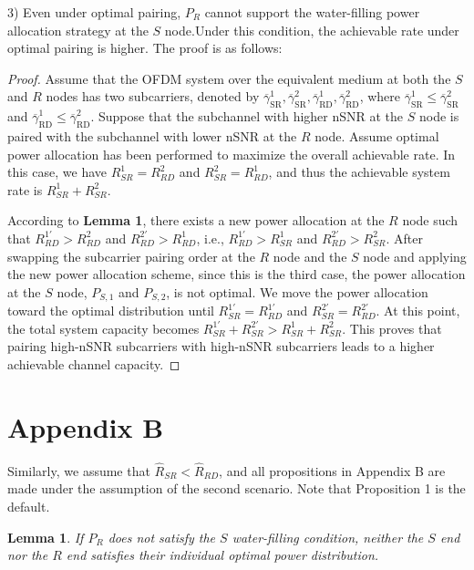 \documentclass[lettersize,journal]{IEEEtran}
\newtheorem{lemma}{Lemma}  %
\begin{document}
	3) Even under optimal pairing, \( P_R \) cannot support the water-filling power allocation strategy at the \( S \) node.Under this condition, the achievable rate under optimal pairing is higher. The proof is as follows:
	\begin{proof}
		Assume that the OFDM system over the equivalent medium at both the \( S \) and \( R \) nodes has two subcarriers, denoted by \( \overline{\gamma}_{\mathrm{SR}}^1, \overline{\gamma}_{\mathrm{SR}}^2, \overline{\gamma}_{\mathrm{RD}}^1, \overline{\gamma}_{\mathrm{RD}}^2 \), where \( \overline{\gamma}_{\mathrm{SR}}^1 \le \overline{\gamma}_{\mathrm{SR}}^2 \) and \( \overline{\gamma}_{\mathrm{RD}}^1 \le \overline{\gamma}_{\mathrm{RD}}^2 \). Suppose that the subchannel with higher nSNR at the \( S \) node is paired with the subchannel with lower nSNR at the \( R \) node. Assume optimal power allocation has been performed to maximize the overall achievable rate. In this case, we have \( R_{SR}^1 = R_{RD}^2 \) and \( R_{SR}^2 = R_{RD}^1 \), and thus the achievable system rate is \( R_{SR}^1+R_{SR}^2 \).
		
		According to \textbf{Lemma 1}, there exists a new power allocation at the \( R \) node such that \( R_{RD}^{1'} > R_{RD}^{2} \) and \( R_{RD}^{2'}> R_{RD}^{1} \), i.e., \( R_{RD}^{1'} > R_{SR}^{1} \) and \( R_{RD}^{2'} > R_{SR}^{2} \). After swapping the subcarrier pairing order at the \( R \) node and the \( S \) node and applying the new power allocation scheme, since this is the third case, the power allocation at the \( S \) node, \( P_{S,1} \) and \( P_{S,2} \), is not optimal. We move the power allocation toward the optimal distribution until \(  R_{SR}^{1'} =  R_{RD}^{1'} \) and \(  R_{SR}^{2'} = R_{RD}^{2'} \). At this point, the total system capacity becomes \(  R_{SR}^{1'} +R_{SR}^{2'} > R_{SR}^{1} + R_{SR}^{2} \). This proves that pairing high-nSNR subcarriers with high-nSNR subcarriers leads to a higher achievable channel capacity.
		
	\end{proof}
	
	
	
	
	\section*{Appendix B}
	
	Similarly, we assume that \( \hat{R}_{SR} < \hat{R}_{RD} \), and all propositions in Appendix B are made under the assumption of the second scenario. Note that Proposition 1 is the default.
	\begin{lemma}
		 If \( P_R \) does not satisfy the \(S\) water-filling condition, neither the \(S\) end nor the \(R\) end satisfies their individual optimal power distribution.
	\end{lemma}
	
\end{document}
